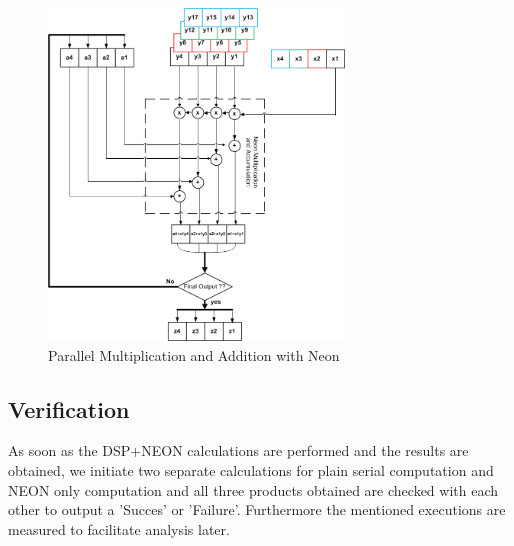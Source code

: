 \begin{figure}[h]
\centering 
\includegraphics[width= 0.7\textwidth]{images/MandA}
\caption{Parallel Multiplication and Addition with Neon  }
\label{fig:neon_mult_add}
\end{figure}

\subsection{Verification}
As soon as the DSP+NEON calculations are performed and the results are obtained, we initiate two separate calculations for plain serial computation and NEON only computation and all three products obtained are checked with each other to output a 'Succes' or 'Failure'. Furthermore the mentioned executions are measured to facilitate analysis later.

